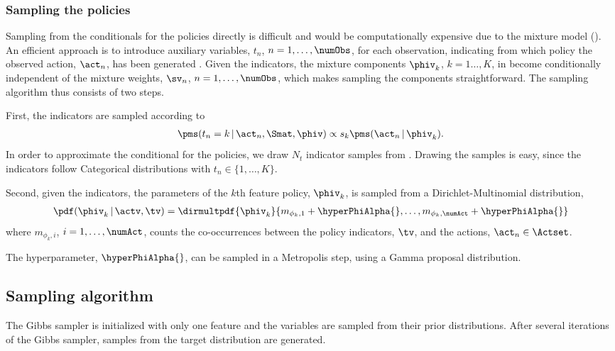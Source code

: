 \documentclass{article}
\begin{document}
\subsubsection{Sampling the policies}
Sampling from the conditionals for the policies directly is difficult and would be computationally expensive due to the mixture model ().
An efficient approach is to introduce auxiliary variables, $t_n$, $n=1,\ldots,\numObs$, for each observation, indicating from which policy the observed action, $\act_n$, has been generated \cite{McLachlan2000}. 
Given the indicators, the mixture components $\phiv_k$, $k=1\ldots,K$, in  become conditionally independent of the mixture weights, $\sv_n$, $n=1,\ldots,\numObs$, which makes sampling the components straightforward. 
The sampling algorithm thus consists of two steps.

First, the indicators are sampled according to
\begin{align}
 \pms( t_n = k \,|\, \act_n, \Smat, \phiv ) \propto s_k \pms(\act_n \,|\, \phiv_k).
 \label{eq::inf::sample::t}
\end{align}
In order to approximate the conditional for the policies, we draw $N_t$ indicator samples from . 
Drawing the samples is easy, since the indicators follow Categorical distributions with $t_n \in \{1, \ldots, K \}$.

Second, given the indicators, the parameters of the $k$th feature policy, $\phiv_k$, is sampled from a Dirichlet-Multinomial distribution,
\begin{align*}
  \pdf(\phiv_k\,|\,\actv,\tv) = \dirmultpdf{\phiv_k}{m_{\phi_k,1} + \hyperPhiAlpha{}, \ldots, m_{\phi_k,\numAct} + \hyperPhiAlpha{}}
\end{align*}
where $m_{\phi_k,i}$, $i=1,\ldots,\numAct$, counts the co-occurrences between the policy indicators, $\tv$, and the actions, $\act_n \in \Actset$. 

The hyperparameter, $\hyperPhiAlpha{}$, can be sampled in a Metropolis step, using a Gamma proposal distribution.

\subsection{Sampling algorithm}
\label{sec::dm::inf::sampling}
The Gibbs sampler is initialized with only one feature and the variables are sampled from their prior distributions.
After several iterations of the Gibbs sampler, samples from the target distribution are generated.
\end{document}
